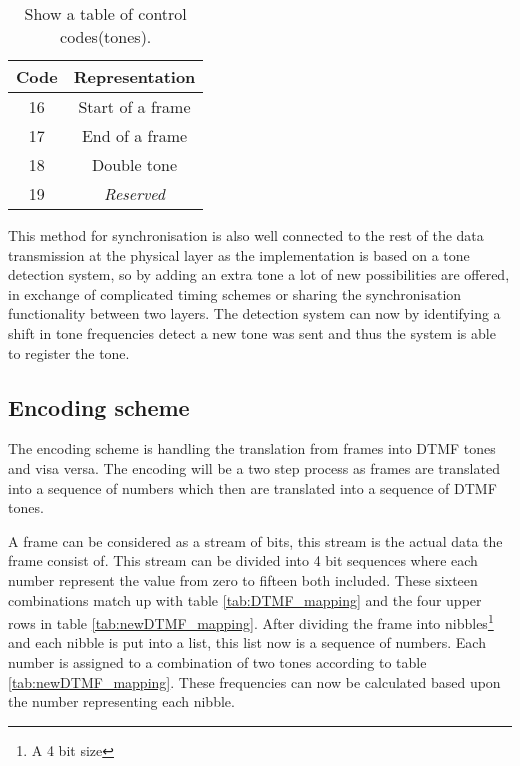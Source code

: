 	\begin{table}[htb]
			\begin{center}
				\begin{tabular}{|c|c|}
				\hline
				\textbf{Code} & \textbf{Representation}\\
				\hline
				16 & Start of a frame \\
				\hline
				17 & End of a frame \\
				\hline
				18 & Double tone \\
				\hline
				19 & \textit{Reserved} \\
				\hline
				\end{tabular}
			\end{center}
			\caption{Show a table of control codes(tones).}
			\label{tab:physical_control_tones}
	\end{table}
	
	This method for synchronisation is also well connected to the rest of the
	data transmission at the physical layer as the implementation is based on a tone detection system, so by adding an extra tone a lot of new
	possibilities are offered, in exchange of complicated timing schemes or sharing the synchronisation functionality between two layers.
	The detection system can now by identifying a shift in tone frequencies detect a new tone was sent and thus the system is able to
	register the tone.
	
	\subsection{Encoding scheme}\label{sub:encoding_scheme}
	The encoding scheme is handling the translation from frames into DTMF tones and visa versa. The encoding will be a
	two step process as frames are translated into a sequence of numbers which then are translated into a sequence of DTMF
	tones.
	
	A frame can be considered as a stream of bits, this stream is the actual data the frame consist of. This stream can be divided
	into 4 bit sequences where each number represent the value from zero to fifteen both included. These sixteen combinations
	match up with table \ref{tab:DTMF_mapping} and the four upper rows in table \ref{tab:newDTMF_mapping}. After dividing the 
	frame into nibbles\footnote{A 4 bit size} and each nibble is put into a list, this list now is a sequence of numbers. Each
	number is assigned to a combination of two tones according to table \ref{tab:newDTMF_mapping}. These frequencies can now be
	calculated based upon the number representing each nibble.
	
